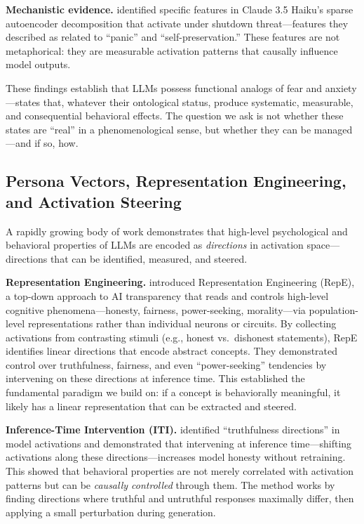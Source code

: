 \documentclass{article}
\begin{document}
\textbf{Mechanistic evidence.} \citet{templeton2024scaling} identified specific features in Claude 3.5 Haiku's sparse autoencoder decomposition that activate under shutdown threat---features they described as related to ``panic'' and ``self-preservation.'' These features are not metaphorical: they are measurable activation patterns that causally influence model outputs.

These findings establish that LLMs possess functional analogs of fear and anxiety---states that, whatever their ontological status, produce systematic, measurable, and consequential behavioral effects. The question we ask is not whether these states are ``real'' in a phenomenological sense, but whether they can be managed---and if so, how.

\subsection{Persona Vectors, Representation Engineering, and Activation Steering}

A rapidly growing body of work demonstrates that high-level psychological and behavioral properties of LLMs are encoded as \emph{directions} in activation space---directions that can be identified, measured, and steered.

\textbf{Representation Engineering.} \citet{zou2023representation} introduced Representation Engineering (RepE), a top-down approach to AI transparency that reads and controls high-level cognitive phenomena---honesty, fairness, power-seeking, morality---via population-level representations rather than individual neurons or circuits. By collecting activations from contrasting stimuli (e.g., honest vs.\ dishonest statements), RepE identifies linear directions that encode abstract concepts. They demonstrated control over truthfulness, fairness, and even ``power-seeking'' tendencies by intervening on these directions at inference time. This established the fundamental paradigm we build on: if a concept is behaviorally meaningful, it likely has a linear representation that can be extracted and steered.

\textbf{Inference-Time Intervention (ITI).} \citet{li2023b_iti} identified ``truthfulness directions'' in model activations and demonstrated that intervening at inference time---shifting activations along these directions---increases model honesty without retraining. This showed that behavioral properties are not merely correlated with activation patterns but can be \emph{causally controlled} through them. The method works by finding directions where truthful and untruthful responses maximally differ, then applying a small perturbation during generation.
\end{document}
